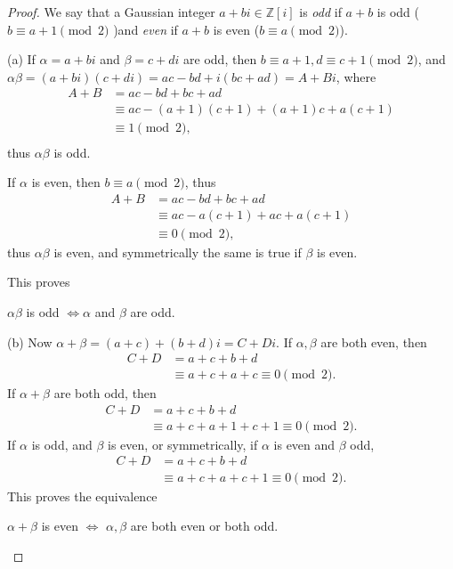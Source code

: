 \documentclass[11pt,a4paper]{article}
\newcommand{\Z}{\mathbb{Z}}
\begin{document}
\begin{proof} 
We say that a Gaussian integer $a+bi \in \Z[i]$ is {\it odd} if $a+b$ is odd ($b \equiv a+1 \pmod 2$ )and {\it even} if $a+b$ is even ($b\equiv a \pmod 2$).


\item[(a)] If $\alpha = a+bi$ and $\beta = c+di$ are odd, then $b \equiv a+1, d \equiv c+1 \pmod 2$, and $\alpha \beta = (a+bi)(c+di) = ac -bd + i (bc+ad) = A + Bi$, where
\begin{align*}
A + B &= ac - bd +bc +ad\\
& \equiv ac - (a+1)(c+1) + (a+1)c +a(c+1)\\ 
&\equiv  1 \pmod 2,\\
\end{align*}
thus $\alpha \beta$ is odd.

If $\alpha$ is even, then $b\equiv a \pmod 2$, thus
\begin{align*}
A+B &= ac - bd +bc +ad\\
&\equiv ac -a (c+1) + ac + a(c+1)\\
&\equiv 0 \pmod 2,
\end{align*}
thus $\alpha \beta$ is even, and symmetrically the same is true if $\beta$ is even.

This proves
\begin{center}
$\alpha \beta$  is odd  $\iff \alpha$ and $\beta$ are odd.
\end{center}
\item[(b)] Now $\alpha + \beta = (a+c) + (b+d)i = C + Di$. 
If $\alpha, \beta$ are both even, then
\begin{align*}
C + D &= a + c + b + d\\
&\equiv a + c + a + c \equiv 0 \pmod 2.
\end{align*}
If $\alpha + \beta$ are both odd, then
\begin{align*}
C + D &= a + c + b + d\\
&\equiv a + c + a + 1  + c+ 1 \equiv 0 \pmod 2.
\end{align*}
If $\alpha$ is odd, and $\beta$ is even, or symmetrically, if $\alpha$ is even and $\beta$ odd,
\begin{align*}
C + D &= a + c + b + d\\
&\equiv a + c + a + c + 1 \equiv 0 \pmod 2.
\end{align*}
This proves the equivalence
\begin{center}
$\alpha + \beta$ is even $\iff$ $\alpha,\beta$ are both even or both odd.
\end{center}


\end{proof}
\end{document}
